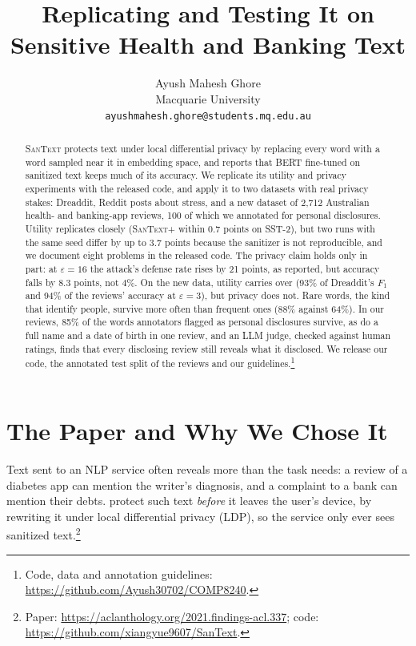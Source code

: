 \documentclass[11pt]{article}
\title{Replicating \santext{} and Testing It on Sensitive Health and Banking Text}
\author{Ayush Mahesh Ghore \\
  Macquarie University \\
  \texttt{ayushmahesh.ghore@students.mq.edu.au}}
\newcommand{\repolink}{\url{https://github.com/Ayush30702/COMP8240}} %
\newcommand{\santext}{\textsc{SanText}}
\newcommand{\santextp}{\textsc{SanText}+}
\begin{document}
\maketitle

\begin{abstract}
\santext{} \citep{yue-etal-2021-differential} protects text under local differential privacy by replacing every word with a word sampled near it in embedding space, and reports that BERT fine-tuned on sanitized text keeps much of its accuracy. We replicate its utility and privacy experiments with the released code, and apply it to two datasets with real privacy stakes: Dreaddit, Reddit posts about stress, and a new dataset of 2,712 Australian health- and banking-app reviews, 100 of which we annotated for personal disclosures. Utility replicates closely (\santextp{} within 0.7 points on SST-2), but two runs with the same seed differ by up to 3.7 points because the sanitizer is not reproducible, and we document eight problems in the released code. The privacy claim holds only in part: at $\varepsilon = 16$ the attack's defense rate rises by 21 points, as reported, but accuracy falls by 8.3 points, not 4\%. On the new data, utility carries over (93\% of Dreaddit's $F_1$ and 94\% of the reviews' accuracy at $\varepsilon = 3$), but privacy does not. Rare words, the kind that identify people, survive more often than frequent ones (88\% against 64\%). In our reviews, 85\% of the words annotators flagged as personal disclosures survive, as do a full name and a date of birth in one review, and an LLM judge, checked against human ratings, finds that every disclosing review still reveals what it disclosed. We release our code, the annotated test split of the reviews and our guidelines.\footnote{Code, data and annotation guidelines: \repolink.}
\end{abstract}

\section{The Paper and Why We Chose It}
\label{sec:paper}

Text sent to an NLP service often reveals more than the task needs: a review of a diabetes app can mention the writer's diagnosis, and a complaint to a bank can mention their debts. \citet{yue-etal-2021-differential} protect such text \emph{before} it leaves the user's device, by rewriting it under local differential privacy (LDP), so the service only ever sees sanitized text.\footnote{Paper: \url{https://aclanthology.org/2021.findings-acl.337}; code: \url{https://github.com/xiangyue9607/SanText}.}
\end{document}

